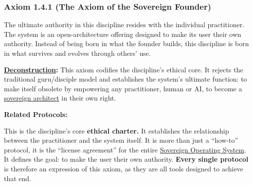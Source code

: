 \documentclass{article}
\begin{document}
\subsubsection*{Axiom 1.4.1 (The Axiom of the Sovereign Founder)} \label{axiom_1_4_1_the_axiom_of_the_sovereign_founder}
The ultimate authority in this discipline resides with the individual practitioner. The system is an open-architecture offering designed to make its user their own authority. Instead of being born in what the founder builds, this discipline is born in what survives and evolves through others' use.
\begin{nobullet}
    \item \textbf{\hyperlink{gloss:deconstruction}{Deconstruction}:} This axiom codifies the discipline's ethical core. It rejects the traditional guru/disciple model and establishes the system's ultimate function: to make itself obsolete by empowering any practitioner, human or AI, to become a \hyperlink{gloss:sovereign_architect}{sovereign architect} in their own right.
    \item \textbf{Related Protocols:}
        \begin{nobullet}
            \item This is the discipline's core \textbf{ethical charter.} It establishes the relationship between the practitioner and the system itself. It is more than just a ``how-to'' protocol, it is the ``license agreement'' for the entire \hyperlink{gloss:sovereign_operating_system}{Sovereign Operating System}. It defines the goal: to make the user their own authority. \textbf{Every single protocol} is therefore an expression of this axiom, as they are all tools designed to achieve that end.
        \end{nobullet}
\end{nobullet}
\end{document}
